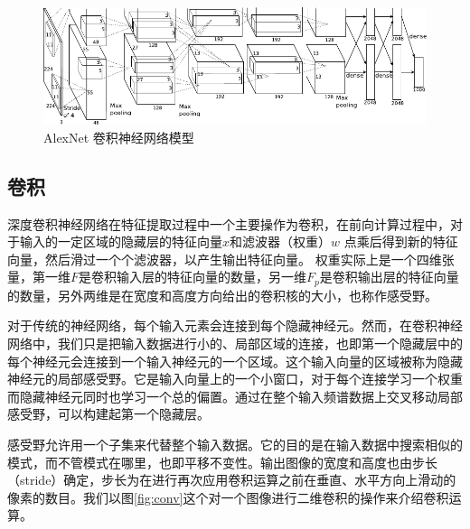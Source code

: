 \begin{figure}
  \centering
  \includegraphics[width=\textwidth]{figures/networks/alexnetarchitecture}
  \caption{ AlexNet 卷积神经网络模型\cite{krizhevsky2012imagenet}}
  \label{fig:cnn_network}
\end{figure}



\subsection{卷积}

深度卷积神经网络在特征提取过程中一个主要操作为卷积，在前向计算过程中，对于输入的一定区域的隐藏层的特征向量$x$和滤波器（权重）$w$ 点乘后得到新的特征向量，然后滑过一个个滤波器，以产生输出特征向量。
权重实际上是一个四维张量，第一维$ F $是卷积输入层的特征向量的数量，另一维$ F_p $是卷积输出层的特征向量的数量，另外两维是在宽度和高度方向给出的卷积核的大小，也称作感受野。

对于传统的神经网络，每个输入元素会连接到每个隐藏神经元。然而，在卷积神经网络中，我们只是把输入数据进行小的、局部区域的连接，也即第一个隐藏层中的每个神经元会连接到一个输入神经元的一个区域。这个输入向量的区域被称为隐藏神经元的局部感受野。它是输入向量上的一个小窗口，对于每个连接学习一个权重而隐藏神经元同时也学习一个总的偏置。通过在整个输入频谱数据上交叉移动局部感受野，可以构建起第一个隐藏层。

感受野允许用一个子集来代替整个输入数据。它的目的是在输入数据中搜索相似的模式，而不管模式在哪里，也即平移不变性。输出图像的宽度和高度也由步长（stride）确定，步长为在进行再次应用卷积运算之前在垂直、水平方向上滑动的像素的数目。我们以图\ref{fig:conv}这个对一个图像进行二维卷积的操作来介绍卷积运算。

